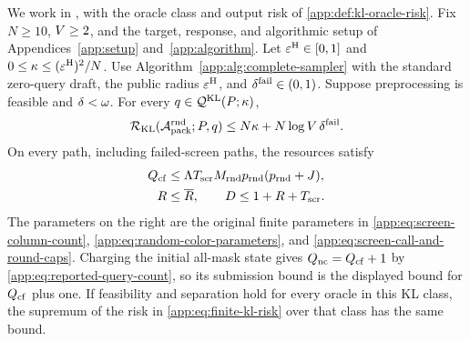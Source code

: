 \begin{theorem}
\label{app:thm:finite-kl-upper}
We work in \KLCase, with the oracle class and output risk of
\cref{app:def:kl-oracle-risk}.
Fix $N\ge10$, $V\ge2$, and the target, response, and algorithmic
setup of Appendices~\ref{app:setup} and~\ref{app:algorithm}.  Let
$\varepsilon^{\mathrm H}\in[0,1]$ and $0\le\kappa\le(\varepsilon^{\mathrm H})^2/N$.
Use Algorithm~\ref{app:alg:complete-sampler} with the standard zero-query
draft, the public radius $\varepsilon^{\mathrm H}$, and
$\delta^{\mathrm{fail}}\in(0,1)$.  Suppose preprocessing is feasible and
$\delta<\omega$.  For every
$q\in\mathcal Q^{\mathrm{KL}}(P;\kappa)$,
\begin{equation}
 \mathcal R_{\mathrm{KL}}(\mathcal A_{\mathrm{pack}}^{\mathrm{rnd}};P,q)
 \le N\kappa+N\log V\,\delta^{\mathrm{fail}}.
 \label{app:eq:finite-kl-risk}
\end{equation}
On every path, including failed-screen paths, the resources satisfy
\begin{align}
 Q_{\mathrm{cf}}
 &\le\Lambda T_{\mathrm{scr}}M_{\mathrm{rnd}}
       p_{\mathrm{rnd}}(p_{\mathrm{rnd}}+J),\notag\\
 R&\le\overline R,
 \qquad
 D\le1+R+T_{\mathrm{scr}}.
 \label{app:eq:finite-kl-resources}
\end{align}
The parameters on the right are the original finite parameters in
\eqref{app:eq:screen-column-count}, \eqref{app:eq:random-color-parameters},
and \eqref{app:eq:screen-call-and-round-caps}.  Charging the initial all-mask
state gives $Q_{\mathrm{nc}}=Q_{\mathrm{cf}}+1$ by
\eqref{app:eq:reported-query-count}, so its submission bound is the
displayed bound for $Q_{\mathrm{cf}}$ plus one.
If feasibility and separation hold
for every oracle in this KL class, the supremum of the risk in
\eqref{app:eq:finite-kl-risk} over that class has the same bound.
\end{theorem}

